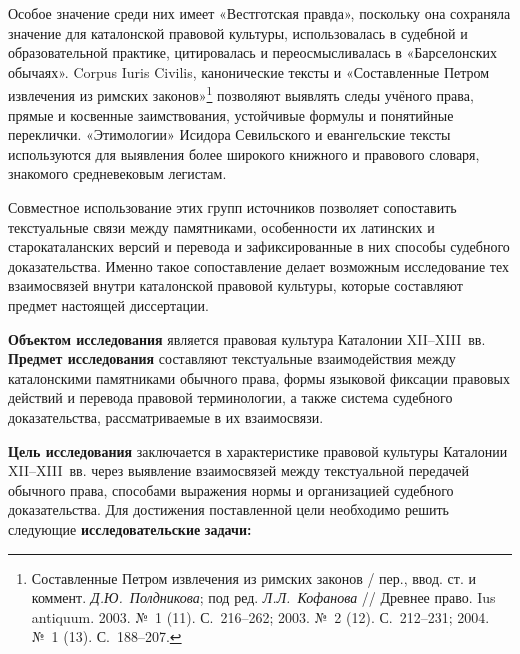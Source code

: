Особое значение среди них имеет «Вестготская правда», поскольку она сохраняла значение для каталонской правовой культуры, использовалась в судебной и образовательной практике, цитировалась и переосмысливалась в «Барселонских обычаях». Corpus Iuris Civilis, канонические тексты и «Составленные Петром извлечения из римских законов»\footnote{Составленные Петром извлечения из римских законов / пер., ввод. ст. и коммент. \emph{Д.Ю.~Полдникова}; под ред. \emph{Л.Л.~Кофанова} // Древнее право. Ius antiquum. 2003. №~1 (11). С.~216--262; 2003. №~2 (12). С.~212--231; 2004. №~1 (13). С.~188--207.} позволяют выявлять следы учёного права, прямые и косвенные заимствования, устойчивые формулы и понятийные переклички. «Этимологии» Исидора Севильского и евангельские тексты используются для выявления более широкого книжного и правового словаря, знакомого средневековым легистам.

Совместное использование этих групп источников позволяет сопоставить текстуальные связи между памятниками, особенности их латинских и старокаталанских версий и перевода и зафиксированные в них способы судебного доказательства. Именно такое сопоставление делает возможным исследование тех взаимосвязей внутри каталонской правовой культуры, которые составляют предмет настоящей диссертации.

\textbf{Объектом исследования} является правовая культура Каталонии XII--XIII~вв. \textbf{Предмет исследования }составляют текстуальные взаимодействия между каталонскими памятниками обычного права, формы языковой фиксации правовых действий и перевода правовой терминологии, а также система судебного доказательства, рассматриваемые в их взаимосвязи.

\textbf{Цель исследования} заключается в характеристике правовой культуры Каталонии XII--XIII~вв. через выявление взаимосвязей между текстуальной передачей обычного права, способами выражения нормы и организацией судебного доказательства. Для достижения поставленной цели необходимо решить следующие\textbf{ }\textbf{исследовательские }\textbf{задачи:}

